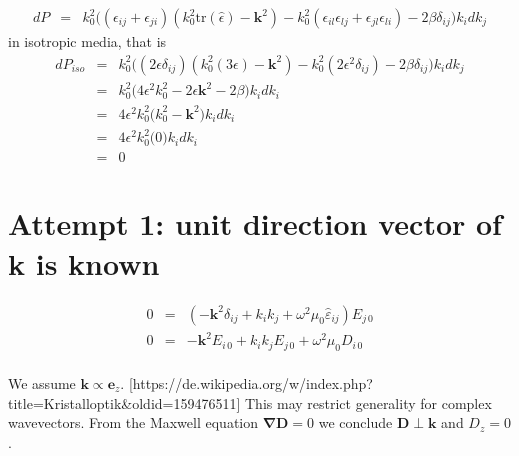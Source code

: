 \documentclass[12pt,a4paper,twoside,openright,BCOR10mm,headsepline,titlepage,abstracton,chapterprefix,final]{scrreprt}
\newcommand\Vector[1]{{\mathbf{#1}}}
\newcommand\wavenumber{k}
\newcommand\Wavevector{\Vector{\wavenumber}}
\newcommand\Nabla{\Vector{\nabla}}
\newcommand\Tensor[1]{\hat{#1}}
\newcommand\scalarDfield{D}
\newcommand\Dfield{\Vector{\scalarDfield}}
\newcommand\permittivity{\Tensor{\scalarpermittivity}}
\newcommand\scalarrelativepermittivity{\epsilon}
\newcommand\relativepermittivity{\Tensor{\scalarrelativepermittivity}}
\newcommand\scalarpermittivity{\varepsilon}
\begin{document}
\begin{eqnarray}
 dP &=& \wavenumber_0^2 
    \bigg( 
       (\scalarrelativepermittivity_{ij} + \scalarrelativepermittivity_{ji}) ( \wavenumber_0^2 \text{tr}(\relativepermittivity) 
     - \Wavevector^2 ) - \wavenumber_0^2 (\scalarrelativepermittivity_{il}\scalarrelativepermittivity_{lj} + \scalarrelativepermittivity_{jl}\scalarrelativepermittivity_{li}) 
     - 2 \beta \delta_{ij}
   \bigg)
   \wavenumber_i d\wavenumber_j 
\end{eqnarray}
in isotropic media, that is
\begin{eqnarray}
 dP_{iso} &=& \wavenumber_0^2 
    \bigg( 
       ( 2 \scalarrelativepermittivity \delta_{ij}) ( \wavenumber_0^2 (3 \scalarrelativepermittivity) 
     - \Wavevector^2 ) - \wavenumber_0^2 ( 2 \scalarrelativepermittivity^2 \delta_{ij})
     - 2 \beta \delta_{ij}
   \bigg)
   \wavenumber_i d\wavenumber_j 
 \\
 &=& \wavenumber_0^2 
    \bigg( 
       4 \scalarrelativepermittivity^2 \wavenumber_0^2 
     - 2 \scalarrelativepermittivity \Wavevector^2
     - 2 \beta
   \bigg)
   \wavenumber_i d\wavenumber_i
 \\
 &=& 4 \scalarrelativepermittivity^2 \wavenumber_0^2 
    \bigg( 
       \wavenumber_0^2 - \Wavevector^2
   \bigg)
   \wavenumber_i d\wavenumber_i
 \\
 &=& 4 \scalarrelativepermittivity^2 \wavenumber_0^2 
    \bigg( 0 \bigg)
   \wavenumber_i d\wavenumber_i
 \\
 &=& 0
\end{eqnarray}



\section{Attempt 1: unit direction vector of k is known}


\begin{eqnarray}
 0 &=& \left(-\Vector{k}^2 \delta_{ij} + k_i k_j + \omega^2 \mu_0 \permittivity_{ij} \right) E_{j\,0} \\
 0 &=& -\Vector{k}^2 E_{i\,0} + k_i k_j E_{j\,0} + \omega^2 \mu_0 D_{i\,0} \\
\end{eqnarray}

We assume $\Wavevector \propto \Vector{e}_z$. [https://de.wikipedia.org/w/index.php?title=Kristalloptik\&oldid=159476511]
This may restrict generality for complex wavevectors.
From the Maxwell equation $\Nabla \Dfield = 0$ we conclude $\Dfield \perp \Wavevector$ and $\scalarDfield_z=0$.
\end{document}
